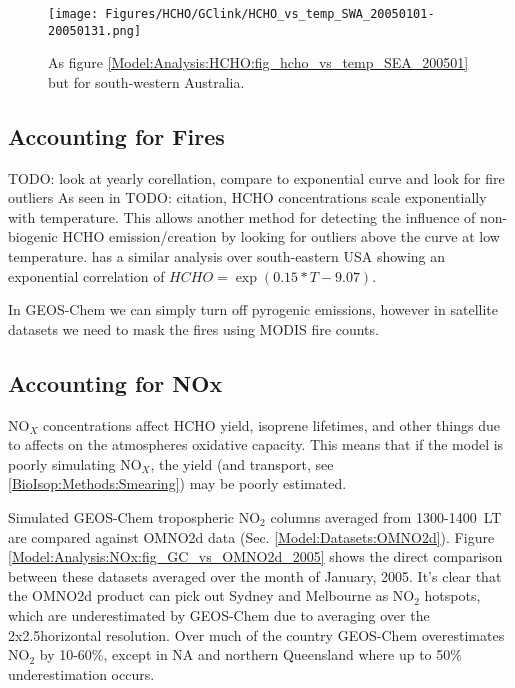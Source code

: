     \begin{figure}
      \texttt{[image: Figures/HCHO/GClink/HCHO\_vs\_temp\_SWA\_20050101-20050131.png]}
      \caption{%
        As figure \ref{Model:Analysis:HCHO:fig_hcho_vs_temp_SEA_200501} but for south-western Australia.
      }
      \label{Model:Analysis:HCHO:fig_hcho_vs_temp_SWA_200501}
    \end{figure}
    
  \subsection{Accounting for Fires}
  
    TODO: look at yearly corellation, compare to exponential curve and look for fire outliers
    As seen in TODO: citation, HCHO concentrations scale exponentially with temperature.
    This allows another method for detecting the influence of non-biogenic HCHO emission/creation by looking for outliers above the curve at low temperature.
    \cite{Zhu2013_poster} has a similar analysis over south-eastern USA showing an exponential correlation of ${HCHO} = \exp(0.15*{T}-9.07)$.
    
    In GEOS-Chem we can simply turn off pyrogenic emissions, however in satellite datasets we need to mask the fires using MODIS fire counts.
    
    
  \subsection{Accounting for NOx}
  \label{Model:Analysis:NOx}
    
    NO$_X$ concentrations affect HCHO yield, isoprene lifetimes, and other things due to affects on the atmospheres oxidative capacity.
    This means that if the model is poorly simulating NO$_X$, the yield (and transport, see \ref{BioIsop:Methods:Smearing}) may be poorly estimated.
    
    Simulated GEOS-Chem tropospheric NO$_2$ columns averaged from 1300-1400~LT are compared against OMNO2d data (Sec. \ref{Model:Datasets:OMNO2d}). 
    Figure \ref{Model:Analysis:NOx:fig_GC_vs_OMNO2d_2005} shows the direct comparison between these datasets averaged over the month of January, 2005.
    It's clear that the OMNO2d product can pick out Sydney and Melbourne as NO$_2$ hotspots, which are underestimated by GEOS-Chem due to averaging over the 2x2.5\degr horizontal resolution.
    Over much of the country GEOS-Chem overestimates NO$_2$ by 10-60\%, except in NA and northern Queensland where up to 50\% underestimation occurs.
    
